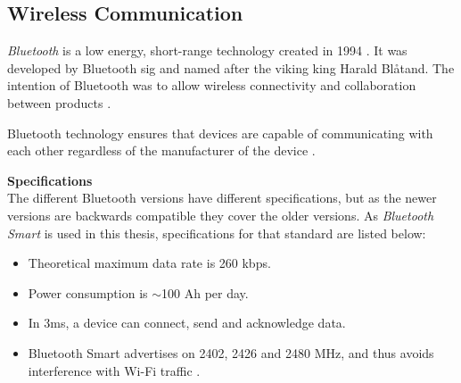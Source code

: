 \subsection{Wireless Communication}
\textit{Bluetooth} is a low energy, short-range technology created in 1994 \cite{ble2016}. It was developed by Bluetooth \acrfull{sig} and named after the viking king Harald Blåtand. The intention of Bluetooth was to allow wireless connectivity and collaboration between products \cite{bluetoothsig2016}.

Bluetooth technology ensures that devices are capable of communicating with each other regardless of the manufacturer of the device \cite{prabhu2004}.  

\textbf{Specifications}
\\
The different Bluetooth versions have different specifications, but as the newer versions are backwards compatible \cite{bluetoothreport2013} they cover the older versions. As \textit{Bluetooth Smart} is used in this thesis, specifications for that standard are listed below:

\begin{itemize}
    \item Theoretical maximum data rate is 260 kbps.
    \item Power consumption is $\sim$100 \micro Ah per day.
    \item In 3ms, a device can connect, send and acknowledge data.
    \item Bluetooth Smart advertises on 2402, 2426 and 2480 MHz, and thus avoids interference with Wi-Fi traffic \cite{csr2010}.
\end{itemize}
